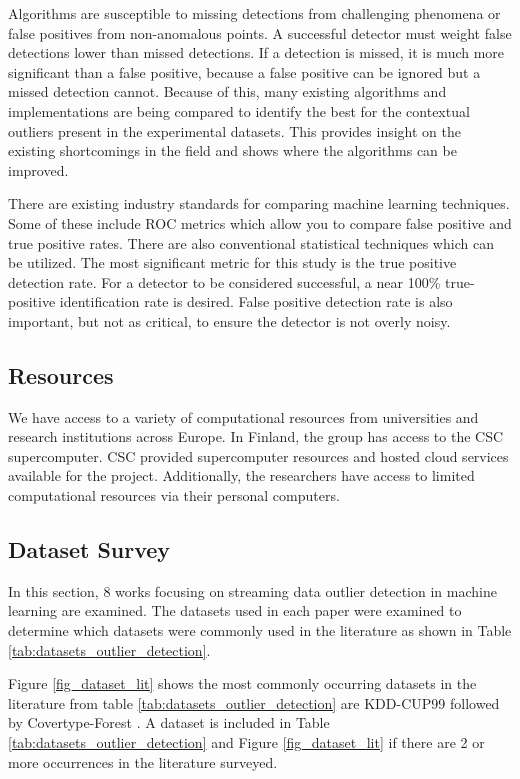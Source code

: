 Algorithms are susceptible to missing detections from challenging phenomena or false positives from non-anomalous points.
A successful detector must weight false detections lower than missed detections.
If a detection is missed, it is much more significant than a false positive, because a false positive can be ignored but a missed detection cannot.
Because of this, many existing algorithms and implementations are being compared to identify the best for the contextual outliers present in the experimental datasets.
This provides insight on the existing shortcomings in the field and shows where the algorithms can be improved.

There are existing industry standards for comparing machine learning techniques.
Some of these include ROC metrics which allow you to compare false positive and true positive rates.
There are also conventional statistical techniques which can be utilized.
The most significant metric for this study is the true positive detection rate.
For a detector to be considered successful, a near 100\% true-positive identification rate is desired.
False positive detection rate is also important, but not as critical, to ensure the detector is not overly noisy.

\subsection{Resources}

We have access to a variety of computational resources from universities and research institutions across Europe.
In Finland, the group has access to the CSC supercomputer.
CSC provided supercomputer resources and hosted cloud services available for the project.
Additionally, the researchers have access to limited computational resources via their personal computers.

\subsection{Dataset Survey}
\label{ref_dataset_survey}

In this section, 8 works focusing on streaming data outlier detection in machine learning are examined.
The datasets used in each paper were examined to determine which datasets were commonly used in the literature as shown in Table \ref{tab:datasets_outlier_detection}.

\newpage


Figure \ref{fig_dataset_lit} shows the most commonly occurring datasets in the literature from table \ref{tab:datasets_outlier_detection} are KDD-CUP99 \parencite{kdd1999} followed by Covertype-Forest \parencite{covertype-dataset}.
A dataset is included in Table \ref{tab:datasets_outlier_detection} and Figure \ref{fig_dataset_lit} if there are 2 or more occurrences in the literature surveyed.

